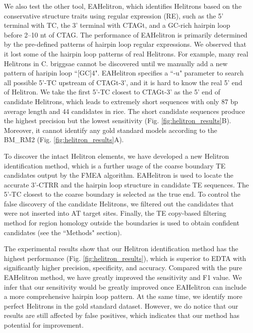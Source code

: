 \documentclass{bmcart}
\begin{document}
We also test the other tool, EAHelitron, which identifies Helitrons based on the conservative structure traits using regular expression (RE), such as the 5’ terminal with TC, the 3’ terminal with CTAGt, and a GC-rich hairpin loop before 2–10 nt of CTAG. The performance of EAHelitron is primarily determined by the pre-defined patterns of hairpin loop regular expressions. We observed that it lost some of the hairpin loop patterns of real Helitrons. For example, many real Helitrons in C. briggsae cannot be discovered until we manually add a new pattern of haripin loop ``[GC]{4}". EAHelitron specifies a ``-u" parameter to search all possible 5'-TC upstream of CTAGt-3', and it is hard to know the real 5' end of Helitron. We take the first 5'-TC closest to CTAGt-3' as the 5' end of candidate Helitrons, which leads to extremely short sequences with only 87 bp average length and 44 candidates in rice. The short candidate sequences produce the highest precision but the lowest sensitivity (Fig. \ref{fig:helitron_results}B). Moreover, it cannot identify any gold standard models according to the BM\_RM2 (Fig. \ref{fig:helitron_results}A).

To discover the intact Helitron elements, we have developed a new Helitron identification method, which is a further usage of the coarse boundary TE candidates output by the FMEA algorithm. EAHelitron is used to locate the accurate 3'-CTRR and the hairpin loop structure in candidate TE sequences. The 5'-TC closest to the coarse boundary is selected as the true end. To control the false discovery of the candidate Helitrons, we filtered out the candidates that were not inserted into AT target sites. Finally, the TE copy-based filtering method for region homology outside the boundaries is used to obtain confident candidates (see the ``Methods" section).

The experimental results show that our Helitron identification method has the highest performance (Fig. \ref{fig:helitron_results}), which is superior to EDTA with significantly higher precision, specificity, and accuracy. Compared with the pure EAHelitron method, we have greatly improved the sensitivity and F1 value. We infer that our sensitivity would be greatly improved once EAHelitron can include a more comprehensive hairpin loop pattern. At the same time, we identify more perfect Helitrons in the gold standard dataset. However, we do notice that our results are still affected by false positives, which indicates that our method has potential for improvement.
\end{document}

